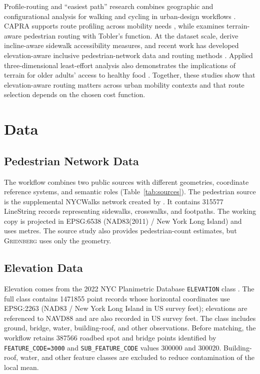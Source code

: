 \documentclass[twocolumn,10pt]{article}
\newcommand{\dataset}{\textsc{Gridnberg}\xspace}
\begin{document}
Profile-routing and ``easiest path'' research combines geographic and configurational analysis for walking and cycling in urban-design workflows \citep{nourian2015configurbanist,nourian2015easiest}. CAPRA supports route profiling across mobility needs \citep{rahaman2017capra}, while \citet{higgins2021hiking} examines terrain-aware pedestrian routing with Tobler's function. At the dataset scale, \citet{bolten2021routine} derive incline-aware sidewalk accessibility measures, and recent work has developed elevation-aware inclusive pedestrian-network data and routing methods \citep{hosseini2024inclusive}. Applied three-dimensional least-effort analysis also demonstrates the implications of terrain for older adults' access to healthy food \citep{ng2024beyond}. Together, these studies show that elevation-aware routing matters across urban mobility contexts and that route selection depends on the chosen cost function.

\section{Data}

\subsection{Pedestrian Network Data}

The workflow combines two public sources with different geometries, coordinate reference systems, and semantic roles (Table~\ref{tab:sources}). The pedestrian source is the supplemental NYCWalks network created by \citet{sevtsuk2026spatial}. It contains \num{315577} LineString records representing sidewalks, crosswalks, and footpaths. The working copy is projected in EPSG:6538 (NAD83(2011) / New York Long Island) and uses metres. The source study also provides pedestrian-count estimates, but \dataset uses only the geometry.

\subsection{Elevation Data}

Elevation comes from the 2022 NYC Planimetric Database \texttt{ELEVATION} class \citep{nyc2022elevation,nyc2022capture}. The full class contains \num{1471855} point records whose horizontal coordinates use EPSG:2263 (NAD83 / New York Long Island in US survey feet); elevations are referenced to NAVD88 and are also recorded in US survey feet. The class includes ground, bridge, water, building-roof, and other observations. Before matching, the workflow retains \num{387566} roadbed spot and bridge points identified by \texttt{FEATURE\_CODE=3000} and \texttt{SUB\_FEATURE\_CODE} values 300000 and 300020. Building-roof, water, and other feature classes are excluded to reduce contamination of the local mean.
\end{document}
